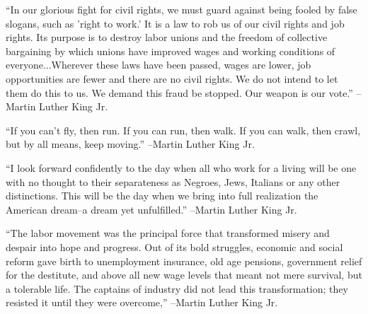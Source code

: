 \documentclass{article}%
\begin{document}
\linebreak%
\vspace{1mm}%
\begin{minipage}{\textwidth}%
\flushleft%
“In our glorious fight for civil rights, we must guard against being fooled by false slogans, such as 'right to work.' It is a law to rob us of our civil rights and job rights. Its purpose is to destroy labor unions and the freedom of collective bargaining by which unions have improved wages and working conditions of everyone...Wherever these laws have been passed, wages are lower, job opportunities are fewer and there are no civil rights. We do not intend to let them do this to us. We demand this fraud be stopped. Our weapon is our vote.”%
\linebreak%
\vspace{1mm}%
–Martin Luther King Jr.%
\linebreak%
\vspace{1mm}%
\end{minipage}%
\linebreak%
\vspace{1mm}%
\begin{minipage}{\textwidth}%
\flushleft%
“If you can't fly, then run. If you can run, then walk. If you can walk, then crawl, but by all means, keep moving.”%
\linebreak%
\vspace{1mm}%
–Martin Luther King Jr.%
\linebreak%
\vspace{1mm}%
\end{minipage}%
\linebreak%
\vspace{1mm}%
\begin{minipage}{\textwidth}%
\flushleft%
“I look forward confidently to the day when all who work for a living will be one with no thought to their separateness as Negroes, Jews, Italians or any other distinctions. This will be the day when we bring into full realization the American dream–a dream yet unfulfilled.”%
\linebreak%
\vspace{1mm}%
–Martin Luther King Jr.%
\linebreak%
\vspace{1mm}%
\end{minipage}%
\linebreak%
\vspace{1mm}%
\begin{minipage}{\textwidth}%
\flushleft%
“The labor movement was the principal force that transformed misery and despair into hope and progress. Out of its bold struggles, economic and social reform gave birth to unemployment insurance, old age pensions, government relief for the destitute, and above all new wage levels that meant not mere survival, but a tolerable life. The captains of industry did not lead this transformation; they resisted it until they were overcome,”%
\linebreak%
\vspace{1mm}%
–Martin Luther King Jr.%
\linebreak%
\vspace{1mm}%
\end{minipage}%
\end{document}
